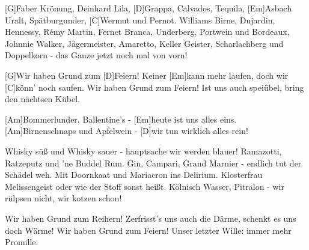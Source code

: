 

\begin{guitar}
	[G]Faber Krönung, Deinhard Lila, [D]Grappa, Calvados, Tequila,
	[Em]Asbach Uralt, Spätburgunder, [C]Wermut und Pernot.
	Williams Birne, Dujardin, Hennessy, Rémy Martin,
	Fernet Branca, Underberg, Portwein und Bordeaux,
	Johnnie Walker, Jägermeister, Amaretto, Keller Geister,
	Scharlachberg und Doppelkorn - das Ganze jetzt noch mal von vorn!
	
	[G]Wir haben Grund zum [D]Feiern!
	Keiner [Em]kann mehr laufen, doch wir [C]könn' noch saufen.
	Wir haben Grund zum Feiern!
	Ist uns auch speiübel, bring den nächtsen Kübel.
	
	[Am]Bommerlunder, Ballentine's - [Em]heute ist uns alles eins.
	[Am]Birnenschnaps und Apfelwein - [D]wir tun wirklich alles rein!
	
	Whisky süß und Whisky sauer - hauptsache wir werden blauer!
	Ramazotti, Ratzeputz und 'ne Buddel Rum.
	Gin, Campari, Grand Marnier - endlich tut der Schädel weh.
	Mit Doornkaat und Mariacron ins Delirium.
	Klosterfrau Melissengeist oder wie der Stoff sonst heißt.
	Kölnisch Wasser, Pitralon - wir rülpsen nicht, wir kotzen schon!
	
	Wir haben Grund zum Reihern!
	Zerfrisst's uns auch die Därme, schenkt es uns doch Wärme!
	Wir haben Grund zum Feiern!
	Unser letzter Wille: immer mehr Promille.
\end{guitar}